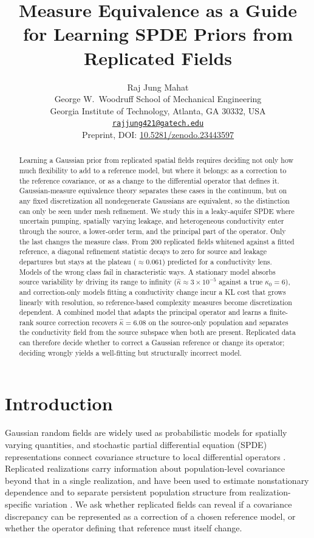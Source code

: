 \documentclass[11pt]{article}
\title{Measure Equivalence as a Guide for Learning SPDE Priors from Replicated Fields}
\author{Raj Jung Mahat\\[0.3em]
{\normalsize George W.\ Woodruff School of Mechanical Engineering}\\
{\normalsize Georgia Institute of Technology, Atlanta, GA 30332, USA}\\
{\normalsize \href{mailto:rajjung421@gatech.edu}{\texttt{rajjung421@gatech.edu}}}\\[0.6em]
{\small Preprint, DOI: \href{https://doi.org/10.5281/zenodo.23443597}{10.5281/zenodo.23443597}}}
\date{}
\numberwithin{table}{section}
\numberwithin{figure}{section}
\begin{document}
\maketitle

\begin{abstract}
Learning a Gaussian prior from replicated spatial fields requires deciding not only how much flexibility to add to a reference model, but where it belongs: as a correction to the reference covariance, or as a change to the differential operator that defines it. Gaussian-measure equivalence theory separates these cases in the continuum, but on any fixed discretization all nondegenerate Gaussians are equivalent, so the distinction can only be seen under mesh refinement. We study this in a leaky-aquifer SPDE where uncertain pumping, spatially varying leakage, and heterogeneous conductivity enter through the source, a lower-order term, and the principal part of the operator. Only the last changes the measure class. From 200 replicated fields whitened against a fitted reference, a diagonal refinement statistic decays to zero for source and leakage departures but stays at the plateau ($\approx0.061$) predicted for a conductivity lens. Models of the wrong class fail in characteristic ways. A stationary model absorbs source variability by driving its range to infinity ($\widehat\kappa\approx3\times10^{-5}$ against a true $\kappa_0=6$), and correction-only models fitting a conductivity change incur a KL cost that grows linearly with resolution, so reference-based complexity measures become discretization dependent. A combined model that adapts the principal operator and learns a finite-rank source correction recovers $\widehat\kappa=6.08$ on the source-only population and separates the conductivity field from the source subspace when both are present. Replicated data can therefore decide whether to correct a Gaussian reference or change its operator; deciding wrongly yields a well-fitting but structurally incorrect model.
\end{abstract}

\section{Introduction}

Gaussian random fields are widely used as probabilistic models for spatially varying quantities, and stochastic partial differential equation (SPDE) representations connect covariance structure to local differential operators \citep{Lindgren2011,LindgrenBolinRue2022}. Replicated realizations carry information about population-level covariance beyond that in a single realization, and have been used to estimate nonstationary dependence and to separate persistent population structure from realization-specific variation \citep{Ingebrigtsen2015,Fuglstad2015}. We ask whether replicated fields can reveal if a covariance discrepancy can be represented as a correction of a chosen reference model, or whether the operator defining that reference must itself change.
\end{document}
